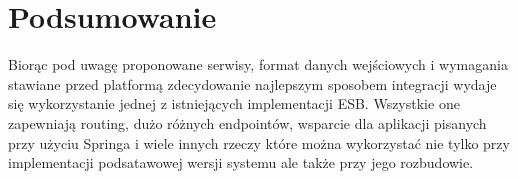 \section*{Podsumowanie}
Biorąc pod uwagę proponowane serwisy, format danych wejściowych i wymagania stawiane przed platformą zdecydowanie najlepszym sposobem integracji wydaje się wykorzystanie jednej z istniejących implementacji ESB. Wszystkie one zapewniają routing, dużo różnych endpointów, wsparcie dla aplikacji pisanych przy użyciu Springa i wiele innych rzeczy które można wykorzystać nie tylko przy implementacji podsatawowej wersji systemu ale także przy jego rozbudowie. 





















